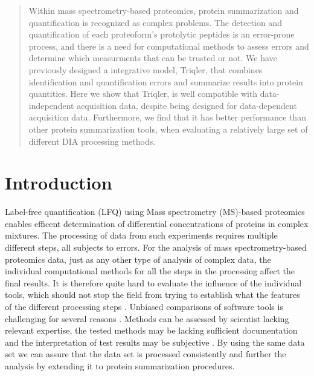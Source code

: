 \documentclass[10pt,letterpaper]{article}
\begin{document}
\maketitle



\begin{abstract}

Within mass spectrometry-based proteomics, protein summarization and quantification is recognized as complex problems. The detection and quantification of each proteoform's protolytic peptides is an error-prone process, and there is a need for computational methods to assess errors and determine which measurments that can be trusted or not.  We have previously designed a integrative model, Triqler, that combines identification and quantification errors and summarize results into protein quantities. 
Here we show that Triqler, is well compatible with data-independent acquisition data, despite being designed for data-dependent acquisition data. Furthermore, we find that it has better performance than other protein summarization tools, when evaluating a relatively large set of different DIA processing methods. 

\end{abstract}
  

\section*{Introduction}

Label-free quantification (LFQ) using Mass spectrometry (MS)-based proteomics enables efficent determination of differential concentrations of proteins in complex mixtures. The processing of data from such experiments requires multiple different steps, all subjects to errors. 
For the analysis of mass spectrometry-based proteomics data, just as any other type of analysis of complex data, the individual computational methods for all the steps in the processing affect the final results. It is therefore quite hard to evaluate the influence of the individual tools, which should not stop the field from trying to establish what the features of the different processing steps \cite{dufresne2014abrf,gatto2016testing,navarro2016multicenter}. Unbiased comparisons of software tools is challenging for several reasons \cite{dufresne2014abrf}. Methods can be assessed by scientist lacking relevant expertise, the tested methods may be lacking sufficient documentation and the interpretation of test results may be subjective \cite{yates2012toward} \cite{leprevost2014best} \cite{pak2013clustering} \cite{faircomparison2015}. By using the same data set we can assure that the data set is processed consistently and further the analysis by extending it to protein summarization procedures.
\end{document}
